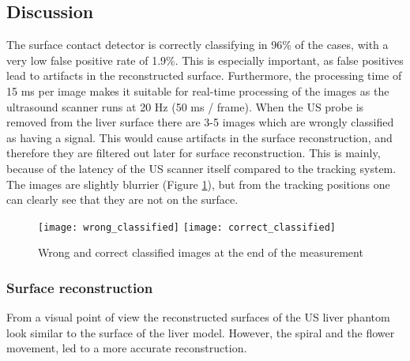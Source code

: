 \subsection{Discussion}
The surface contact detector is correctly classifying in 96\% of the cases, with
a very low false positive rate of 1.9\%. This is especially important, as false
positives lead to artifacts in the reconstructed surface. Furthermore, the
processing time of 15 ms per image makes it suitable for real-time processing of
the images as the ultrasound scanner runs at 20 Hz (50 ms / frame). When the US
probe is removed from the liver surface there are 3-5 images which are wrongly
classified as having a signal. This would cause artifacts in the surface
reconstruction, and therefore they are filtered out later for surface
reconstruction. This is mainly, because of the latency of the US scanner itself
compared to the tracking system. The images are slightly blurrier (Figure \ref{fig:classificationProblem}), but
from the tracking positions one can clearly see that they are not on the
surface.


\begin{figure}[H]
  \centering
    \texttt{[image: wrong\_classified]}
  \endminipage
  \hfill
  \endminipage
    \texttt{[image: correct\_classified]}
  \endminipage
  \caption{Wrong and correct classified images at the end of the measurement}
  \label{fig:classificationProblem}
\end{figure}

\subsubsection{Surface reconstruction}
From a visual point of view the reconstructed surfaces of the US liver phantom
look similar to the surface of the liver model. However, the spiral and the
flower movement, led to a more accurate reconstruction.

